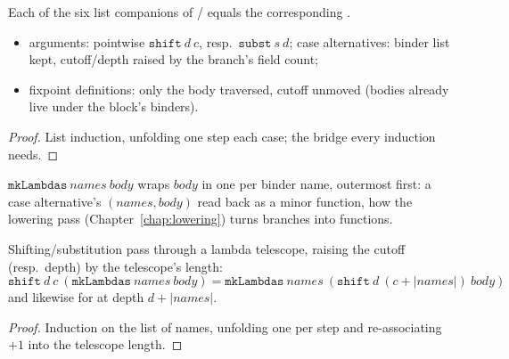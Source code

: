 \begin{lemma}
\label{lem:LBTerm-shiftArgs_eq_map}
\leanok
{}
 Each of the six list companions of / equals the corresponding .
\begin{itemize}
\item arguments: pointwise $\mathtt{shift}\ d\ c$, resp.\ $\mathtt{subst}\ s\ d$; case alternatives: binder list kept, cutoff/depth raised by the branch's field count;
\item fixpoint definitions: only the body traversed, cutoff unmoved (bodies already live under the block's binders).
\end{itemize}
\end{lemma}
\begin{proof}
\leanok
{}
 List induction, unfolding one step each case; the bridge every  induction needs.
\end{proof}

\begin{definition}
\label{def:mkLambdas}
\leanok
{}
 $\mathtt{mkLambdas}\ names\ body$ wraps $body$ in one  per binder name, outermost first: a case alternative's $(names,body)$ read back as a minor function, how the lowering pass (Chapter~\ref{chap:lowering}) turns branches into functions.
\end{definition}

\begin{lemma}
\label{lem:shift_mkLambdas}
\leanok
{}
 Shifting/substitution pass through a lambda telescope, raising the cutoff (resp.\ depth) by the telescope's length:
$$\mathtt{shift}\ d\ c\ (\mathtt{mkLambdas}\ names\ body) = \mathtt{mkLambdas}\ names\ (\mathtt{shift}\ d\ (c+|names|)\ body)$$
and likewise for  at depth $d + |names|$.
\end{lemma}
\begin{proof}
\leanok
{}
 Induction on the list of names, unfolding one  per step and re-associating $+1$ into the telescope length.
\end{proof}

